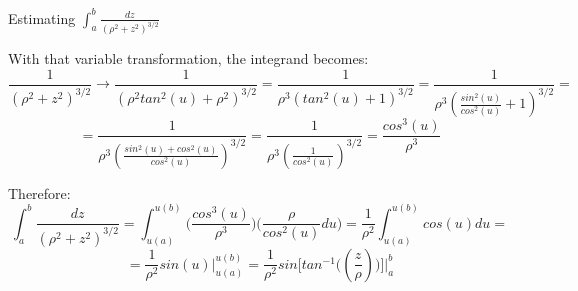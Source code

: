 \begin{frame}{Estimating $\int_{a}^{b} \frac{dz}{({\rho}^2+z^2)^{3/2}}$}

{\small
With that variable transformation, the integrand becomes:
\begin{equation*}
   \frac{1}{({\rho}^2+z^2)^{3/2}} \rightarrow
     \frac{1}{({\rho}^{2}tan^{2}(u)+{\rho}^{2})^{3/2}} =
     \frac{1}{{\rho}^{3}(tan^{2}(u)+1)^{3/2}} =
     \frac{1}{{\rho}^{3}( \frac{sin^{2}(u)}{cos^{2}(u)}+1)^{3/2}} =
\end{equation*}
\begin{equation*}
   = \frac{1}{{\rho}^{3}( \frac{sin^{2}(u)+cos^{2}(u)}{cos^{2}(u)})^{3/2}} =
     \frac{1}{{\rho}^{3}( \frac{1}{cos^{2}(u)})^{3/2}} =
     \frac{cos^{3}(u)}{{\rho}^{3}}
\end{equation*}

Therefore:
\begin{equation*}
  \int_{a}^{b} \frac{dz}{({\rho}^2+z^2)^{3/2}} =
    \int_{u(a)}^{u(b)} \Big( \frac{cos^{3}(u)}{{\rho}^{3}} \Big) \Big( \frac{{\rho}}{cos^{2}(u)} du \Big) =
    \frac{1}{{\rho}^2} \int_{u(a)}^{u(b)} cos(u) du =
\end{equation*}
\begin{equation*}
   = \frac{1}{{\rho}^2} sin(u) \biggr\rvert_{u(a)}^{u(b)}
   = \frac{1}{{\rho}^2} sin\Big[ tan^{-1}\Big((\frac{z}{{\rho}})\Big) \Big]  \biggr\rvert_{a}^{b}
\end{equation*}
}
\end{frame}

%
%
%

